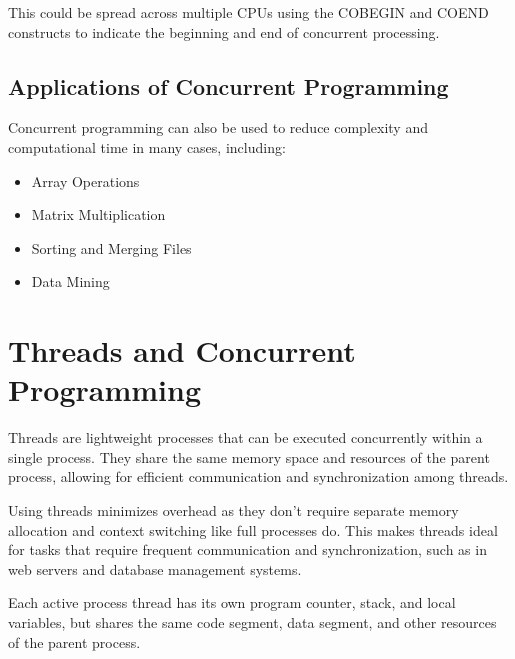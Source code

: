 \documentclass[12pt letter]{report}
\begin{document}
This could be spread across multiple CPUs using the COBEGIN and
COEND constructs to indicate the beginning and end of concurrent
processing.

\subsection{Applications of Concurrent Programming}
Concurrent programming can also be used to reduce complexity and
computational time in many cases, including:
\begin{itemize}
  \item Array Operations
  \item Matrix Multiplication
  \item Sorting and Merging Files
  \item Data Mining
\end{itemize}

%
%


\section{Threads and Concurrent Programming}

Threads are lightweight processes that can be executed concurrently
within a single process. They share the same memory space and resources
of the parent process, allowing for efficient communication and
synchronization among threads.

Using threads minimizes overhead as they don't require separate memory
allocation and context switching like full processes do. This makes
threads ideal for tasks that require frequent communication and
synchronization, such as in web servers and database management systems.

Each active process thread has its own program counter, stack, and local
variables, but shares the same code segment, data segment, and other
resources of the parent process.
\end{document}

